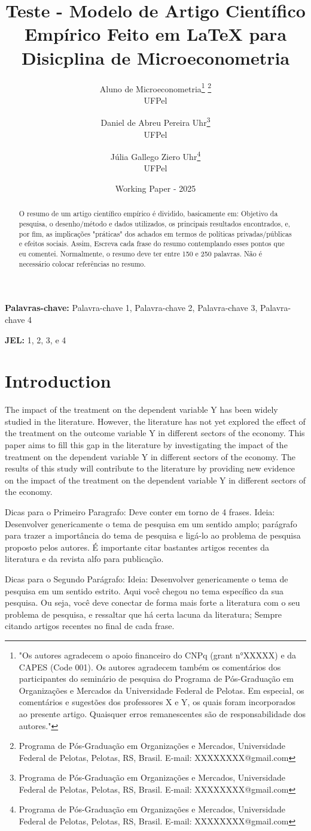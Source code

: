 \documentclass[a4paper]{article}
\title{Teste - Modelo de Artigo Científico Empírico Feito em LaTeX para Disicplina de Microeconometria}
\author{Aluno de Microeconometria\footnote{"Os autores agradecem o apoio financeiro do CNPq (grant n°XXXXX) e da CAPES (Code 001). Os autores agradecem também os comentários dos participantes do seminário de pesquisa do Programa de Pós-Graduação em Organizações e Mercados da Universidade Federal de Pelotas. Em especial, os comentários e sugestões dos professores X e Y, os quais foram incorporados ao presente artigo. Quaisquer erros remanescentes são de responsabilidade dos autores."} \footnote{Programa de Pós-Graduação em Organizações e Mercados, Universidade Federal de Pelotas, Pelotas, RS, Brasil. E-mail: XXXXXXXX@gmail.com} \\ UFPel \and Daniel de Abreu Pereira Uhr\footnote{Programa de Pós-Graduação em Organizações e Mercados, Universidade Federal de Pelotas, Pelotas, RS, Brasil. E-mail: XXXXXXXX@gmail.com} \\ UFPel \and Júlia Gallego Ziero Uhr\footnote{Programa de Pós-Graduação em Organizações e Mercados, Universidade Federal de Pelotas, Pelotas, RS, Brasil. E-mail: XXXXXXXX@gmail.com} \\ UFPel}
\date{Working Paper - 2025}
\begin{document}
\maketitle 

\begin{abstract}
O resumo de um artigo científico empírico é dividido, basicamente em: Objetivo da pesquisa, o desenho/método e dados utilizados, os principais resultados encontrados, e, por fim, as implicações "práticas" dos achados em termos de políticas privadas/públicas e efeitos sociais. Assim, Escreva cada frase do resumo contemplando esses pontos que eu comentei. Normalmente, o resumo deve ter entre 150 e 250 palavras. Não é necessário colocar referências no resumo.
\end{abstract}

\textbf{Palavras-chave:} Palavra-chave 1, Palavra-chave 2, Palavra-chave 3, Palavra-chave 4

\textbf{JEL:}  1, 2, 3, e 4


\section{Introduction}

The impact of the treatment on the dependent variable Y has been widely studied in the literature. However, the literature has not yet explored the effect of the treatment on the outcome variable Y in different sectors of the economy. This paper aims to fill this gap in the literature by investigating the impact of the treatment on the dependent variable Y in different sectors of the economy. The results of this study will contribute to the literature by providing new evidence on the impact of the treatment on the dependent variable Y in different sectors of the economy.


Dicas para o Primeiro Paragrafo: Deve conter em torno de 4 frases. Ideia: Desenvolver genericamente o tema de pesquisa em um sentido amplo; parágrafo para trazer a importância do tema de pesquisa e ligá-lo ao problema de pesquisa proposto pelos autores. É importante citar bastantes artigos recentes da literatura e da revista alfo para publicação.

Dicas para o Segundo Parágrafo: Ideia: Desenvolver genericamente o tema de pesquisa em um sentido estrito. Aqui você chegou no tema específico da sua pesquisa. Ou seja, você deve conectar de forma mais forte a literatura com o seu problema de pesquisa, e ressaltar que há certa lacuna da literatura; Sempre citando artigos recentes no final de cada frase.
\end{document}

